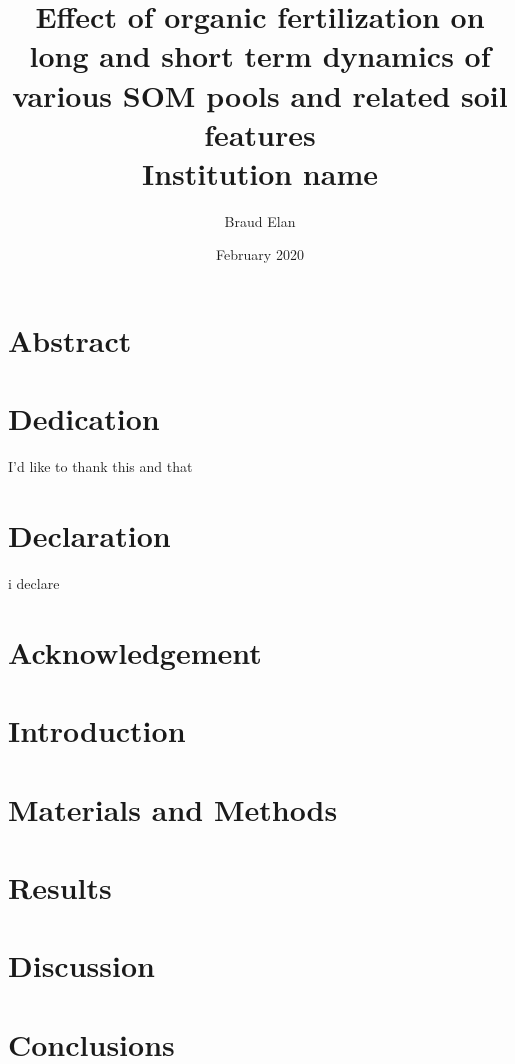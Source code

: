 \documentclass[12pt]{report}
\title{
    {Effect of organic fertilization on long and short term dynamics of various SOM pools and related soil features}\\ 
    {\large Institution name}\\
}
\author{Braud Elan }
\date{February 2020}
\begin{document}
	\maketitle

	\chapter*{Abstract}
	    

	\chapter*{Dedication}
	    I'd like to thank this and that

	\chapter*{Declaration}
	    i declare

	\chapter*{Acknowledgement}
	\tableofcontents

	\chapter{Introduction}
	    

	\chapter{Materials and Methods}
	    

	\chapter{Results}
	    

	\chapter{Discussion}
  		

	\chapter{Conclusions}
		



\end{document}
